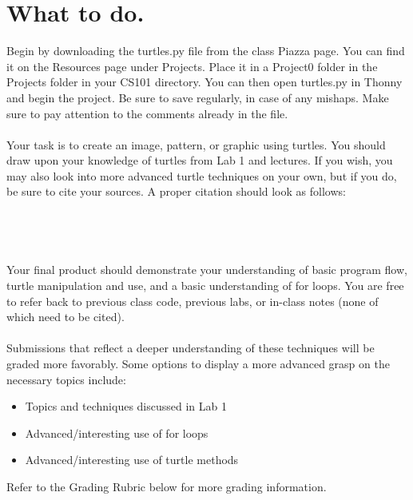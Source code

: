 \documentclass[11pt, letterpaper, onecolumn, oneside, final]{article}
\begin{document}
    \section{What to do.} Begin by downloading the {\consolas turtles.py} file from the class Piazza page. You can find it on the Resources page under Projects. Place it in a Project0 folder in the Projects folder in your CS101 directory. You can then open {\consolas turtles.py} in Thonny and begin the project. Be sure to save regularly, in case of any mishaps. Make sure to pay attention to the comments already in the file. \\
    \\
    Your task is to create an image, pattern, or graphic using turtles. You should draw upon your knowledge of turtles from Lab 1 and lectures. If you wish, you may also look into more advanced turtle techniques on your own, but if you do, be sure to cite your sources. A proper citation should look as follows:\\
\\
\\
\\
\\
Your final product should demonstrate your understanding of basic program flow, turtle manipulation and use, and a basic understanding of for loops. You are free to refer back to previous class code, previous labs, or in-class notes (none of which need to be cited). \\
\\
Submissions that reflect a deeper understanding of these techniques will be graded more favorably. Some options to display a more advanced grasp on the necessary topics include:
\begin{itemize}
    \item Topics and techniques discussed in Lab 1
    \item Advanced/interesting use of for loops
    \item Advanced/interesting use of turtle methods
\end{itemize}

Refer to the Grading Rubric below for more grading information.
\newpage
\end{document}
